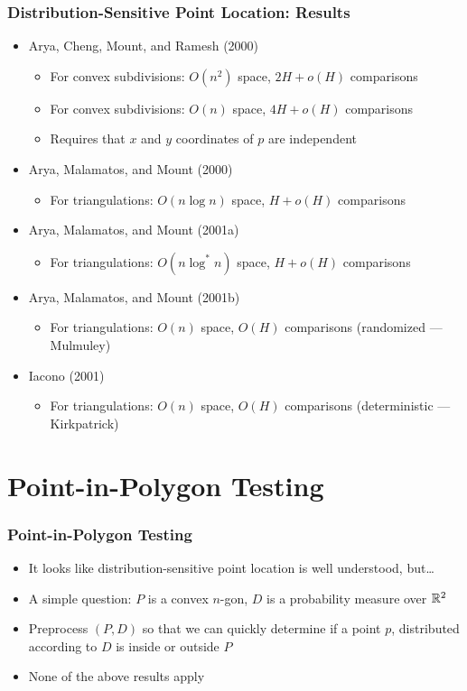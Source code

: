 \documentclass{beamer}
\begin{document}
\frame
{
   \frametitle{Distribution-Sensitive Point Location: Results}
   \begin{itemize}
   \item<1-> Arya, Cheng, Mount, and Ramesh (2000)
    \begin{itemize}
      \item<1->For convex subdivisions: $O(n^2)$ space, $2H+o(H)$ comparisons
      \item<1->For convex subdivisions: $O(n)$ space, $4H+o(H)$ comparisons
      \item<1->Requires that $x$ and $y$ coordinates of $p$ are independent
    \end{itemize}
   \item<2-> Arya, Malamatos, and Mount (2000)
    \begin{itemize}
      \item<2->For triangulations: $O(n\log n)$ space, $H+o(H)$ comparisons
    \end{itemize} 
    \item<3-> Arya, Malamatos, and Mount (2001a)
    \begin{itemize}
      \item<3->For triangulations: $O(n\log^* n)$ space, $H+o(H)$ comparisons
    \end{itemize} 
    \item<4-> Arya, Malamatos, and Mount (2001b)
    \begin{itemize}
      \item<4->For triangulations: $O(n)$ space, $O(H)$ comparisons
(randomized --- Mulmuley)
    \end{itemize} 
    \item<5-> Iacono (2001)
    \begin{itemize}
      \item<5->For triangulations: $O(n)$ space, $O(H)$ comparisons
(deterministic --- Kirkpatrick)
    \end{itemize} 
   \end{itemize}


}

\section{Point-in-Polygon Testing}
\frame
{
   \frametitle{Point-in-Polygon Testing}
   \begin{itemize}
   \item<1-> It looks like distribution-sensitive point location is 
	well understood, but\ldots
   \item<2-> A simple question: $P$ is a convex $n$-gon, $D$ is a
	probability measure over $\mathbb{R}^2$
   \item<3-> Preprocess $(P,D)$ so that we can quickly determine if a
point $p$, distributed according to $D$ is inside or outside $P$
   \item<4-> None of the above results apply
   \end{itemize}
}
\end{document}
